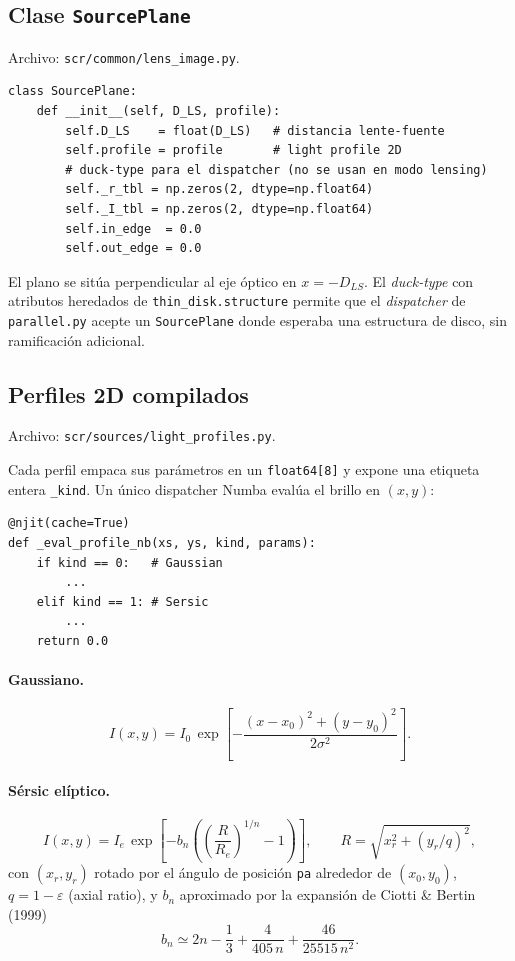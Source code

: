 \documentclass[11pt,a4paper]{article}
\begin{document}
\subsection{Clase \texttt{SourcePlane}}

Archivo: \texttt{scr/common/lens\_image.py}.

\begin{lstlisting}[style=py]
class SourcePlane:
    def __init__(self, D_LS, profile):
        self.D_LS    = float(D_LS)   # distancia lente-fuente
        self.profile = profile       # light profile 2D
        # duck-type para el dispatcher (no se usan en modo lensing)
        self._r_tbl = np.zeros(2, dtype=np.float64)
        self._I_tbl = np.zeros(2, dtype=np.float64)
        self.in_edge  = 0.0
        self.out_edge = 0.0
\end{lstlisting}

El plano se sitúa perpendicular al eje óptico en $x = -D_{LS}$. El
\emph{duck-type} con atributos heredados de \texttt{thin\_disk.structure}
permite que el \emph{dispatcher} de \texttt{parallel.py} acepte un
\texttt{SourcePlane} donde esperaba una estructura de disco, sin
ramificación adicional.

\subsection{Perfiles 2D compilados}

Archivo: \texttt{scr/sources/light\_profiles.py}.

Cada perfil empaca sus parámetros en un \texttt{float64[8]} y expone una
etiqueta entera \texttt{\_kind}. Un único dispatcher Numba evalúa el
brillo en $(x,y)$:

\begin{lstlisting}[style=py]
@njit(cache=True)
def _eval_profile_nb(xs, ys, kind, params):
    if kind == 0:   # Gaussian
        ...
    elif kind == 1: # Sersic
        ...
    return 0.0
\end{lstlisting}

\paragraph{Gaussiano.}
\begin{equation}
  I(x,y) = I_0\,\exp\!\left[-\frac{(x-x_0)^2 + (y-y_0)^2}{2\sigma^2}\right].
\end{equation}

\paragraph{Sérsic elíptico.}
\begin{equation}
  I(x,y) = I_e\,\exp\!\left[-b_n\!\left(\left(\frac{R}{R_e}\right)^{1/n}
  - 1\right)\right],
  \qquad
  R = \sqrt{x_r^2 + (y_r/q)^2},
\end{equation}
con $(x_r,y_r)$ rotado por el ángulo de posición \texttt{pa} alrededor
de $(x_0,y_0)$, $q = 1 - \varepsilon$ (axial ratio),
y $b_n$ aproximado por la expansión de Ciotti \& Bertin (1999)
\begin{equation}
  b_n \simeq 2n - \frac{1}{3} + \frac{4}{405\,n}
            + \frac{46}{25515\,n^2}.
\end{equation}
\end{document}
